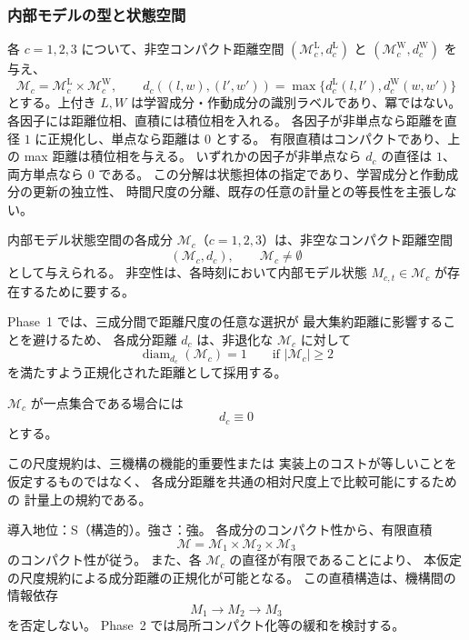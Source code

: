 \subsubsection{内部モデルの型と状態空間}

\begin{assumption}
\label{ass:M_compact}

各 $c=1,2,3$ について、非空コンパクト距離空間
$(\mathcal M_c^{\mathrm L},d_c^{\mathrm L})$ と $(\mathcal M_c^{\mathrm W},d_c^{\mathrm W})$ を与え、
\[
 \mathcal M_c=\mathcal M_c^{\mathrm L}\times\mathcal M_c^{\mathrm W},\qquad
 d_c((l,w),(l',w'))=\max\{d_c^{\mathrm L}(l,l'),d_c^{\mathrm W}(w,w')\}
\]
とする。上付き $L,W$ は学習成分・作動成分の識別ラベルであり、冪ではない。
各因子には距離位相、直積には積位相を入れる。
各因子が非単点なら距離を直径 $1$ に正規化し、単点なら距離は $0$ とする。
有限直積はコンパクトであり、上の max 距離は積位相を与える。
いずれかの因子が非単点なら $d_c$ の直径は $1$、両方単点なら $0$ である。
この分解は状態担体の指定であり、学習成分と作動成分の更新の独立性、
時間尺度の分離、既存の任意の計量との等長性を主張しない。

内部モデル状態空間の各成分
$\mathcal{M}_c$（$c=1,2,3$）は、非空なコンパクト距離空間
\[
  (\mathcal{M}_c,d_c),
  \qquad
  \mathcal{M}_c\neq\emptyset
\]
として与えられる。
非空性は、各時刻において内部モデル状態
$M_{c,t}\in\mathcal{M}_c$ が存在するために要する。

Phase~1 では、三成分間で距離尺度の任意な選択が
最大集約距離に影響することを避けるため、
各成分距離 $d_c$ は、非退化な
$\mathcal{M}_c$ に対して
\[
  \operatorname{diam}_{d_c}(\mathcal{M}_c)=1
  \qquad
  \text{if }|\mathcal{M}_c|\geq2
\]
を満たすよう正規化された距離として採用する。

$\mathcal{M}_c$ が一点集合である場合には
\[
  d_c\equiv0
\]
とする。

この尺度規約は、三機構の機能的重要性または
実装上のコストが等しいことを仮定するものではなく、
各成分距離を共通の相対尺度上で比較可能にするための
計量上の規約である。

\medskip
\noindent
導入地位：S（構造的）。強さ：強。
各成分のコンパクト性から、有限直積
\[
  \mathcal{M}
  =
  \mathcal{M}_1
  \times
  \mathcal{M}_2
  \times
  \mathcal{M}_3
\]
のコンパクト性が従う。
また、各 $\mathcal{M}_c$ の直径が有限であることにより、
本仮定の尺度規約による成分距離の正規化が可能となる。
この直積構造は、機構間の情報依存
\[
  M_1\to M_2\to M_3
\]
を否定しない。
Phase~2 では局所コンパクト化等の緩和を検討する。
\end{assumption}

